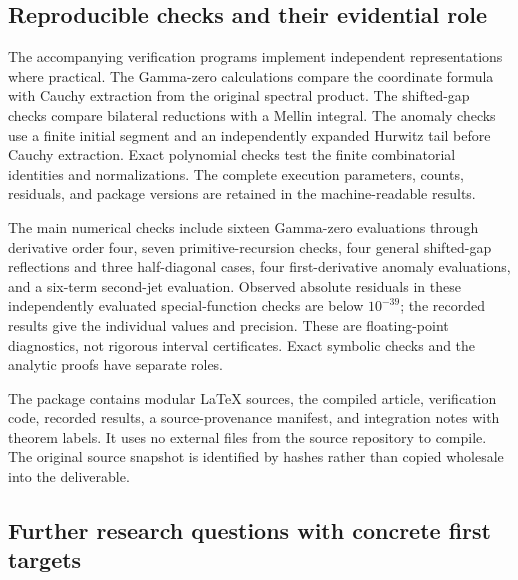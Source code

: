 \subsection{Reproducible checks and their evidential role}

The accompanying verification programs implement independent
representations where practical. The Gamma-zero calculations compare
the coordinate formula with Cauchy extraction from the original
spectral product. The shifted-gap checks compare bilateral reductions
with a Mellin integral. The anomaly checks use a finite initial segment
and an independently expanded Hurwitz tail before Cauchy extraction.
Exact polynomial checks test the finite combinatorial identities and
normalizations. The complete execution parameters, counts, residuals,
and package versions are retained in the machine-readable results.

The main numerical checks include sixteen Gamma-zero evaluations
through derivative order four, seven primitive-recursion checks,
four general shifted-gap reflections and three half-diagonal cases,
four first-derivative anomaly evaluations, and a six-term second-jet
evaluation. Observed absolute residuals in these independently evaluated
special-function checks are below $10^{-39}$; the recorded results give
the individual values and precision. These are floating-point
diagnostics, not rigorous interval certificates. Exact symbolic checks
and the analytic proofs have separate roles.

The package contains modular \LaTeX{} sources, the compiled article,
verification code, recorded results, a source-provenance manifest,
and integration notes with theorem labels. It uses no external files
from the source repository to compile. The original source snapshot is
identified by hashes rather than copied wholesale into the deliverable.

\subsection{Further research questions with concrete first targets}
\label{sec:questions}

